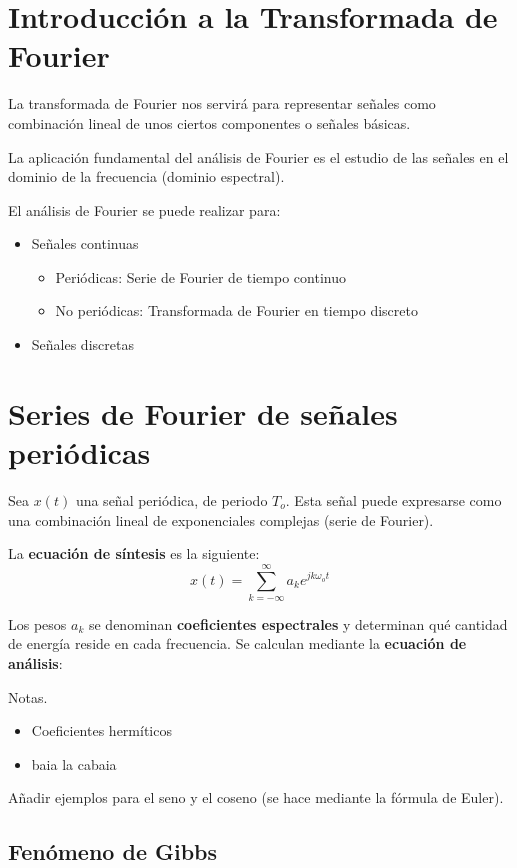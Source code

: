 \documentclass[a4paper]{book}
\begin{document}
\section{Introducción a la Transformada de Fourier}

La transformada de Fourier nos servirá para representar señales como combinación lineal de unos ciertos componentes o señales básicas.

La aplicación fundamental del análisis de Fourier es el estudio de las señales en el dominio de la frecuencia (dominio espectral).

El análisis de Fourier se puede realizar para:
\begin{itemize}
	 \item Señales continuas
	 \begin{itemize}
		  \item Periódicas: Serie de Fourier de tiempo continuo
		  \item No periódicas: Transformada de Fourier en tiempo discreto
	 \end{itemize}
	 \item Señales discretas 
\end{itemize}

\section{Series de Fourier de señales periódicas}
Sea $x(t)$ una señal periódica, de periodo $T_o$. Esta señal puede expresarse como una combinación lineal de exponenciales complejas (serie de Fourier).

La \textbf{ecuación de síntesis} es la siguiente:
\begin{equation}
	x(t) = \sum_{k=-\infty}^{\infty}a_k e^{jk\omega _o t}
\end{equation}

Los pesos $a_k$ se denominan \textbf{coeficientes espectrales} y determinan qué cantidad de energía reside en cada frecuencia. Se calculan mediante la \textbf{ecuación de análisis}:
\[  \]

Notas.
\begin{itemize}
	 \item Coeficientes hermíticos
	 \item baia la cabaia
\end{itemize}

Añadir ejemplos para el seno y el coseno (se hace mediante la fórmula de Euler).

\subsection{Fenómeno de Gibbs}
\end{document}
